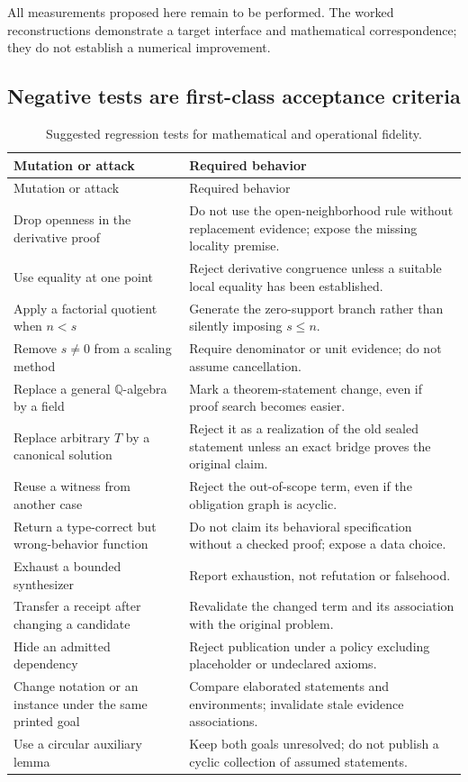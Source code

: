 \documentclass[11pt,a4paper]{article}
\newcommand{\Q}{\mathbb Q}
\theoremstyle{remark}
\begin{document}
All measurements proposed here remain to be performed. The worked reconstructions demonstrate a target interface and mathematical correspondence; they do not establish a numerical improvement.

\subsection{Negative tests are first-class acceptance criteria}

\begin{longtable}{@{}>{\raggedright\arraybackslash}p{}>{\raggedright\arraybackslash}p{}@{}}
\caption{Suggested regression tests for mathematical and operational fidelity.}\label{tab:negative}\\
\toprule
Mutation or attack & Required behavior \\
\midrule
\endfirsthead
\toprule
Mutation or attack & Required behavior \\
\midrule
\endhead
\bottomrule
\endfoot
Drop openness in the derivative proof & Do not use the open-neighborhood rule without replacement evidence; expose the missing locality premise. \\
Use equality at one point & Reject derivative congruence unless a suitable local equality has been established. \\
Apply a factorial quotient when $n<s$ & Generate the zero-support branch rather than silently imposing $s\le n$. \\
Remove $s\ne0$ from a scaling method & Require denominator or unit evidence; do not assume cancellation. \\
Replace a general $\Q$-algebra by a field & Mark a theorem-statement change, even if proof search becomes easier. \\
Replace arbitrary $T$ by a canonical solution & Reject it as a realization of the old sealed statement unless an exact bridge proves the original claim. \\
Reuse a witness from another case & Reject the out-of-scope term, even if the obligation graph is acyclic. \\
Return a type-correct but wrong-behavior function & Do not claim its behavioral specification without a checked proof; expose a data choice. \\
Exhaust a bounded synthesizer & Report exhaustion, not refutation or falsehood. \\
Transfer a receipt after changing a candidate & Revalidate the changed term and its association with the original problem. \\
Hide an admitted dependency & Reject publication under a policy excluding placeholder or undeclared axioms. \\
Change notation or an instance under the same printed goal & Compare elaborated statements and environments; invalidate stale evidence associations. \\
Use a circular auxiliary lemma & Keep both goals unresolved; do not publish a cyclic collection of assumed statements. \\
\end{longtable}
\end{document}
